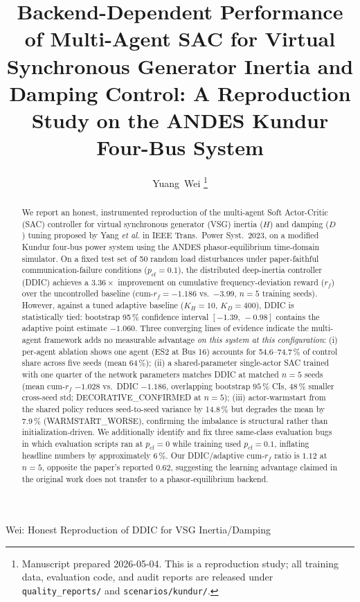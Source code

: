 \documentclass[journal,onecolumn,11pt]{IEEEtran}
\begin{document}
\title{Backend-Dependent Performance of Multi-Agent SAC for Virtual
Synchronous Generator Inertia and Damping Control: A Reproduction
Study on the ANDES Kundur Four-Bus System}

\author{Yuang~Wei%
\thanks{Manuscript prepared 2026-05-04. This is a reproduction study;
all training data, evaluation code, and audit reports are released
under \texttt{quality\_reports/} and \texttt{scenarios/kundur/}.}}

%
{Wei: Honest Reproduction of DDIC for VSG Inertia/Damping}

\maketitle

\begin{abstract}
We report an honest, instrumented reproduction of the multi-agent Soft
Actor-Critic (SAC) controller for virtual synchronous generator (VSG)
inertia ($H$) and damping ($D$) tuning proposed by Yang \emph{et al.}
in IEEE Trans.\ Power Syst.\ 2023, on a modified Kundur four-bus power
system using the ANDES phasor-equilibrium time-domain simulator. On a
fixed test set of 50 random load disturbances under paper-faithful
communication-failure conditions ($p_{\text{cf}} = 0.1$), the
distributed deep-inertia controller (DDIC) achieves a $3.36\times$
improvement on cumulative frequency-deviation reward ($r_f$) over the
uncontrolled baseline (cum-$r_f = -1.186$ vs.\ $-3.99$, $n = 5$ training
seeds). However, against a tuned adaptive baseline ($K_H = 10$,
$K_D = 400$), DDIC is statistically tied: bootstrap 95\,\%
confidence interval $[-1.39,\,-0.98]$ contains the adaptive point
estimate $-1.060$. Three converging lines of evidence indicate the
multi-agent framework adds no measurable advantage \emph{on this
system at this configuration}: (i) per-agent ablation shows one agent
(ES2 at Bus 16) accounts for 54.6--74.7\,\% of control share across
five seeds (mean 64\,\%); (ii) a shared-parameter single-actor SAC
trained with one quarter of the network parameters matches DDIC at
matched $n = 5$ seeds (mean cum-$r_f$ $-1.028$ vs.\ DDIC $-1.186$,
overlapping bootstrap $95\,\%$ CIs, $48\,\%$ smaller cross-seed std;
DECORATIVE\_CONFIRMED at $n = 5$); (iii) actor-warmstart from the
shared policy reduces seed-to-seed variance by 14.8\,\% but degrades
the mean by 7.9\,\% (WARMSTART\_WORSE), confirming the imbalance is
structural rather than initialization-driven. We additionally identify and fix
three same-class evaluation bugs in which evaluation scripts ran at
$p_{\text{cf}} = 0$ while training used $p_{\text{cf}} = 0.1$, inflating
headline numbers by approximately 6\,\%. Our DDIC/adaptive cum-$r_f$
ratio is $1.12$ at $n = 5$, opposite the paper's reported $0.62$,
suggesting the learning advantage claimed in the original work does not
transfer to a phasor-equilibrium backend.
\end{abstract}
\end{document}
